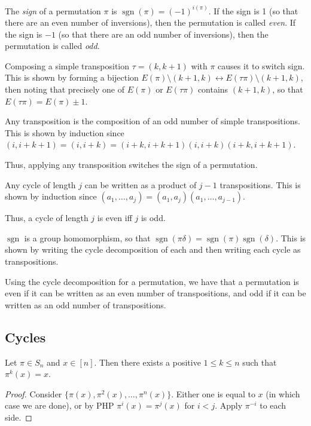 \documentclass[a4paper]{article}
\begin{document}
\begin{definition}
The \emph{sign} of a permutation $\pi$ is $\operatorname{sgn}(\pi)=(-1)^{i(\pi)}$. If the sign is 1 (so that there are an even number of inversions), then the permutation is called \emph{even}. If the sign is $-1$ (so that there are an odd number of inversions), then the permutation is called \emph{odd}.
\begin{arrows}
\item Composing a simple transposition $\tau=(k,k+1)$ with $\pi$ causes it to switch sign. This is shown by forming a bijection $E(\pi)\setminus(k+1,k)\leftrightarrow E(\tau\pi)\setminus(k+1,k)$, then noting that precisely one of $E(\pi)$ or $E(\tau\pi)$ contains $(k+1,k)$, so that $E(\tau\pi)=E(\pi)\pm1$.
\item Any transposition is the composition of an odd number of simple transpositions. This is shown by induction since $(i,i+k+1)=(i,i+k)=(i+k,i+k+1)(i,i+k)(i+k,i+k+1)$.
\item Thus, applying any transposition switches the sign of a permutation.
\item Any cycle of length $j$ can be written as a product of $j-1$ transpositions. This is shown by induction since $(a_1,\dots,a_j)=(a_1,a_j)(a_1,\dots,a_{j-1})$.
\item Thus, a cycle of length $j$ is even iff $j$ is odd.
\item $\operatorname{sgn}$ is a group homomorphism, so that $\operatorname{sgn}(\pi\delta)=\operatorname{sgn}(\pi)\operatorname{sgn}(\delta)$. This is shown by writing the cycle decomposition of each and then writing each cycle as transpositions.
\item Using the cycle decomposition for a permutation, we have that a permutation is even if it can be written as an even number of transpositions, and odd if it can be written as an odd number of transpositions.
\end{arrows}
\end{definition}




\subsection{Cycles}

\begin{lemma}\label{every_element_in_cycle}
Let $\pi\in S_n$ and $x\in[n]$. Then there exists a positive $1\leq k\leq n$ such that $\pi^k(x)=x$.

\begin{hl}
\begin{proof}
Consider $\{\pi(x),\pi^2(x),\dots,\pi^n(x)\}$. Either one is equal to $x$ (in which case we are done), or by PHP $\pi^i(x)=\pi^j(x)$ for $i<j$. Apply $\pi^{-i}$ to each side.
\end{proof}
\end{hl}
\end{lemma}
\end{document}
